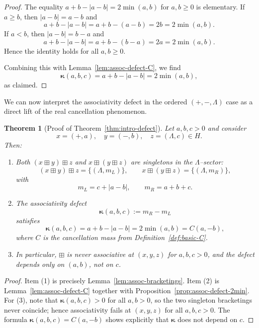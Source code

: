 \documentclass[11pt]{amsart}
\numberwithin{equation}{section}
\newtheorem{theorem}{Theorem}[section]
\theoremstyle{definition}
\theoremstyle{remark}
\newcommand{\Hnum}{H}                      %
\newcommand{\AssocCurv}{\boldsymbol{\kappa}} %
\newcommand{\op}{\boxplus}                 %
\newcommand{\Cfun}{C}                      %
\begin{document}
\begin{proof}
The equality $a+b-|a-b|=2\min(a,b)$ for $a,b\ge0$ is elementary.  If
$a\ge b$, then $|a-b|=a-b$ and
\[
  a+b-|a-b|
  = a+b-(a-b)
  = 2b
  = 2\min(a,b).
\]
If $a<b$, then $|a-b|=b-a$ and
\[
  a+b-|a-b|
  = a+b-(b-a)
  = 2a
  = 2\min(a,b).
\]
Hence the identity holds for all $a,b\ge0$.

Combining this with Lemma~\ref{lem:assoc-defect-C}, we find
\[
  \AssocCurv(a,b,c)
  = a+b-|a-b|
  = 2\min(a,b),
\]
as claimed.
\end{proof}

We can now interpret the associativity defect in the ordered
$(+,-,\Lambda)$ case as a direct lift of the real cancellation
phenomenon.

\begin{theorem}[Proof of Theorem~\ref{thm:intro-defect}]
\label{thm:assoc-defect-proof}
Let $a,b,c>0$ and consider
\[
  x=(+,a),\quad y=(-,b),\quad z=(\Lambda,c)\in\Hnum.
\]
Then:
\begin{enumerate}
  \item Both $(x\op y)\op z$ and $x\op(y\op z)$ are singletons in the
        $\Lambda$--sector:
  \[
    (x\op y)\op z = \{(\Lambda,m_L)\},
    \qquad
    x\op(y\op z) = \{(\Lambda,m_R)\},
  \]
  with
  \[
    m_L = c+|a-b|,
    \qquad
    m_R = a+b+c.
  \]
  \item The associativity defect
  \[
    \AssocCurv(a,b,c)
    := m_R-m_L
  \]
  satisfies
  \[
    \AssocCurv(a,b,c) = a+b-|a-b| = 2\min(a,b) = \Cfun(a,-b),
  \]
  where $\Cfun$ is the cancellation mass from
  Definition~\ref{def:basic-C}.
  \item In particular, $\op$ is never associative at $(x,y,z)$ for
        $a,b,c>0$, and the defect depends only on $(a,b)$, not on $c$.
\end{enumerate}
\end{theorem}

\begin{proof}
Item (1) is precisely Lemma~\ref{lem:assoc-bracketings}.  Item (2)
is Lemma~\ref{lem:assoc-defect-C} together with
Proposition~\ref{prop:assoc-defect-2min}.  For (3), note that
$\AssocCurv(a,b,c)>0$ for all $a,b>0$, so the two singleton bracketings
never coincide; hence associativity fails at $(x,y,z)$ for all
$a,b,c>0$.  The formula $\AssocCurv(a,b,c)=\Cfun(a,-b)$ shows explicitly
that $\AssocCurv$ does not depend on $c$.
\end{proof}
\end{document}
